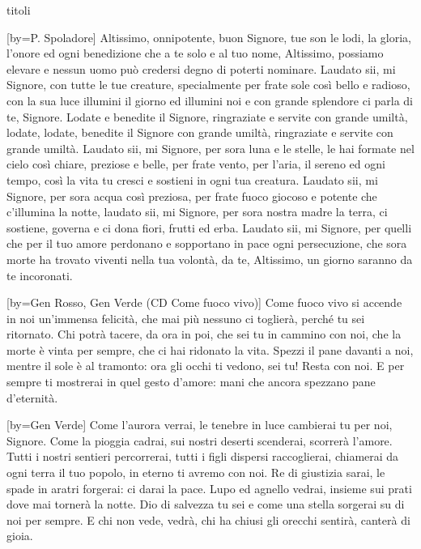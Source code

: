 \begin{songs}{titoli}

[by={P. Spoladore}]
\beginverse
Altissimo, onnipotente, buon Signore,
tue son le lodi, la gloria, l'onore ed ogni benedizione
che a te solo e al tuo nome, Altissimo, possiamo elevare
e nessun uomo può credersi degno di poterti nominare.
\endverse
\beginverse
Laudato sii, mi Signore, con tutte le tue creature,
specialmente per frate sole così bello e radioso,
con la sua luce illumini il giorno ed illumini noi
e con grande splendore ci parla di te, Signore.
\endverse
\beginchorus
Lodate e benedite il Signore,
ringraziate e servite con grande umiltà,
lodate, lodate, benedite il Signore con grande umiltà,
ringraziate e servite con grande umiltà.
\endchorus
\beginverse
Laudato sii, mi Signore, per sora luna e le stelle,
le hai formate nel cielo così chiare, preziose e belle,
per frate vento, per l'aria, il sereno ed ogni tempo,
così la vita tu cresci e sostieni in ogni tua creatura.
\endverse
\beginverse
Laudato sii, mi Signore, per sora acqua così preziosa,
per frate fuoco giocoso e potente che c'illumina la notte,
laudato sii, mi Signore, per sora nostra madre la terra,
ci sostiene, governa e ci dona fiori, frutti ed erba.
\endverse
\beginverse
Laudato sii, mi Signore, per quelli che per il tuo amore
perdonano e sopportano in pace ogni persecuzione,
che sora morte ha trovato viventi nella tua volontà,
da te, Altissimo, un giorno saranno da te incoronati.
\endverse
\endsong

[by={Gen Rosso, Gen Verde (CD Come fuoco vivo)}]
\beginchorus
Come fuoco vivo si accende in noi un'immensa felicità,
che mai più nessuno ci toglierà, perché tu sei ritornato.
Chi potrà tacere, da ora in poi, che sei tu in cammino con noi,
che la morte è vinta per sempre, che ci hai ridonato la vita.
\endchorus
\beginverse
Spezzi il pane davanti a noi, mentre il sole è al tramonto:
ora gli occhi ti vedono, sei tu! Resta con noi.
\endverse
\beginverse
E per sempre ti mostrerai in quel gesto d'amore:
mani che ancora spezzano pane d'eternità.
\endverse
\endsong

[by={Gen Verde}]
\beginverse
Come l'aurora verrai, le tenebre in luce cambierai
tu per noi, Signore.
Come la pioggia cadrai, sui nostri deserti scenderai,
scorrerà l'amore.
\endverse
\beginchorus
Tutti i nostri sentieri percorrerai,
tutti i figli dispersi raccoglierai,
chiamerai da ogni terra il tuo popolo,
in eterno ti avremo con noi.
\endchorus
\beginverse
Re di giustizia sarai, le spade in aratri forgerai:
ci darai la pace.
Lupo ed agnello vedrai, insieme sui prati dove mai
tornerà la notte.
\endverse
\beginverse
Dio di salvezza tu sei e come una stella sorgerai
su di noi per sempre.
E chi non vede, vedrà, chi ha chiusi gli orecchi sentirà,
canterà di gioia.
\endverse
\endsong


\end{songs}
